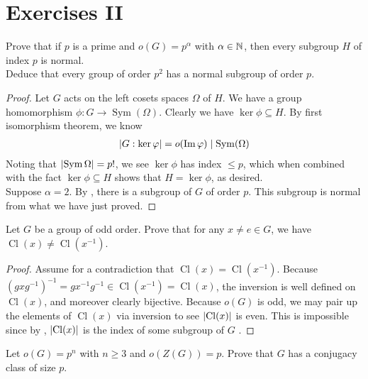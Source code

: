 \documentclass{report}
\begin{document}
\section{Exercises II}
\begin{question}{}{}
Prove that if $p$ is a prime and $o(G)=p^{\alpha }$ with $\alpha \in\mathbb{N}$, then every subgroup $H$ of index $p$ is normal.\\

Deduce that every group of order $p^2$ has a normal subgroup of order  $p$. 
\end{question}
\begin{proof}
Let $G$ acts on the left cosets spaces $\Omega$ of $H$. We have a group homomorphism  $\phi: G \rightarrow \operatorname{Sym}(\Omega)$. Clearly we have $\operatorname{ker}\phi \subseteq H$. By first isomorphism theorem, we know 
\begin{align*}
\left|G: \operatorname{ker}\varphi\right| = o(\operatorname{Im} \varphi) \mid  \operatorname{Sym}(\Omega)
\end{align*}
Noting that $\left|\operatorname{Sym}\Omega\right|=p!$, we see $\operatorname{ker}\phi $ has index $\leq p$, which when combined with the fact $\operatorname{ker}\phi \subseteq H$ shows that $H=\operatorname{ker}\phi$, as desired. \\

Suppose $\alpha =2$. By , there is a subgroup of $G$ of order $p$. This subgroup is normal from what we have just proved.
\end{proof}
\begin{question}{}{}
Let $G$ be a group of odd order. Prove that for any $x\neq e \in G$, we have $\operatorname{Cl}(x)\neq \operatorname{Cl}(x^{-1})$. 
\end{question}
\begin{proof}
Assume for a contradiction that $\operatorname{Cl}(x)=\operatorname{Cl}(x^{-1})$. Because $(gxg^{-1})^{-1} = gx^{-1}g^{-1}\in \operatorname{Cl}(x^{-1})=\operatorname{Cl}(x)$, the inversion is well defined on $\operatorname{Cl}(x)$, and moreover clearly bijective. Because $o(G)$ is odd, we may pair up the elements of  $\operatorname{Cl}(x)$ via inversion to see $\left|\operatorname{Cl}(x)\right|$ is even. This is impossible since by ,  $\left|\operatorname{Cl}(x)\right|$ is the index of some subgroup of $G$ .     
\end{proof}
\begin{question}{}{}
Let $o(G)=p^n$ with $n\geq 3$ and $o(Z(G))=p$. Prove that $G$ has a conjugacy class of size  $p$. 
\end{question}
\end{document}
